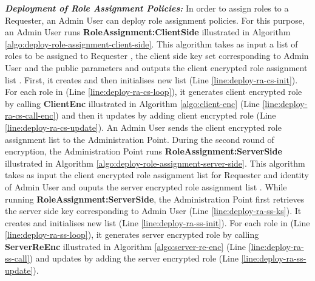 \documentclass[final,5p,times,twocolumn]{elsarticle}
\begin{document}
\emph{\textbf{Deployment of Role Assignment Policies:}} 
In order to assign roles to a Requester, an Admin User can deploy role assignment policies. For this purpose, an Admin User runs \textbf{RoleAssignment:ClientSide} illustrated in Algorithm \ref{algo:deploy-role-assignment-client-side}. This algorithm takes as input a list of roles  to be assigned to Requester , the client side key set  corresponding to Admin User  and the public parameters  and outputs the client encrypted role assignment list . First, it creates and then initialises new list  (Line \ref{line:deploy-ra-cs-init}). For each role in  (Line \ref{line:deploy-ra-cs-loop}), it generates client encrypted role by calling \textbf{ClientEnc} illustrated in Algorithm \ref{algo:client-enc} (Line \ref{line:deploy-ra-cs-call-enc}) and then it updates  by adding client encrypted role (Line \ref{line:deploy-ra-cs-update}). An Admin User sends the client encrypted role assignment list to the Administration Point. 
During the second round of encryption, the Administration Point runs \textbf{RoleAssignment:ServerSide} illustrated in Algorithm \ref{algo:deploy-role-assignment-server-side}. This algorithm takes as input the client encrypted role assignment list  for Requester  and identity  of Admin User and ouputs the server encrypted role assignment list . While running \textbf{RoleAssignment:ServerSide}, the Administration Point first retrieves the server side key  corresponding to Admin User  (Line \ref{line:deploy-ra-ss-ks}). It creates and initialises new list  (Line \ref{line:deploy-ra-ss-init}). For each role in  (Line \ref{line:deploy-ra-ss-loop}), it generates server encrypted role by calling \textbf{ServerReEnc} illustrated in Algorithm \ref{algo:server-re-enc} (Line \ref{line:deploy-ra-ss-call}) and updates  by adding the server encrypted role (Line \ref{line:deploy-ra-ss-update}).
\end{document}
